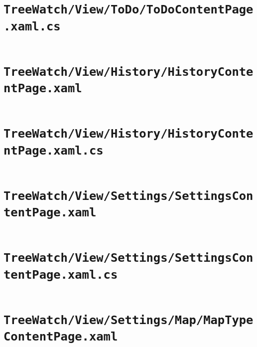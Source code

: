 \documentclass[12pt]{article}
\begin{document}
\section{\texttt{TreeWatch/View/ToDo/ToDoContentPage.xaml.cs}}
	\inputminted[linenos,firstline=22]{csharp}{../../../src/TreeWatch/View/ToDo/ToDoContentPage.xaml.cs}
	\pagebreak

\section[\texttt{TreeWatch/View/History/HistoryContentPage.xaml}]
{\texttt{TreeWatch/View/History/\linebreak HistoryContentPage.xaml}}
	\inputminted[linenos]{xml}{../../../src/TreeWatch/View/History/HistoryContentPage.xaml}
	\pagebreak

\section[\texttt{TreeWatch/View/History/HistoryContentPage.xaml.cs}]
{\texttt{TreeWatch/View/History/\linebreak HistoryContentPage.xaml.cs}}
	\inputminted[linenos,firstline=22]{csharp}{../../../src/TreeWatch/View/History/HistoryContentPage.xaml.cs}
	\pagebreak

\section[\texttt{TreeWatch/View/Settings/SettingsContentPage.xaml}]
{\texttt{TreeWatch/View/Settings/\linebreak SettingsContentPage.xaml}}
	\inputminted[linenos]{xml}{../../../src/TreeWatch/View/Settings/SettingsContentPage.xaml}
	\pagebreak

\section[\texttt{TreeWatch/View/Settings/SettingsContentPage.xaml.cs}]
{\texttt{TreeWatch/View/Settings/\linebreak SettingsContentPage.xaml.cs}}
	\inputminted[linenos,firstline=22]{csharp}{../../../src/TreeWatch/View/Settings/SettingsContentPage.xaml.cs}
	\pagebreak

\section[\texttt{TreeWatch/View/Settings/Map/MapTypeContentPage.xaml}]
{\texttt{TreeWatch/View/Settings/Map/\linebreak MapTypeContentPage.xaml}}
	\inputminted[linenos]{xml}{../../../src/TreeWatch/View/Settings/Map/MapTypeContentPage.xaml}
	\pagebreak
\end{document}
